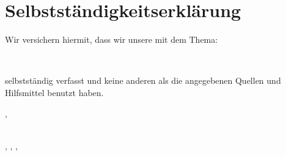 \section*{Selbstständigkeitserklärung}

Wir versichern hiermit, dass wir unsere \dhbwGetTextType{} mit dem Thema:

\begin{center}
    \textbf{%
        {\large \dhbwGetTitle{}}\\
        \ifdef{\dhbwGetSubtitle{}}{%
            \dhbwGetSubtitle{}
        }{}
    }
\end{center}

selbstständig verfasst und keine anderen als die angegebenen Quellen und Hilfsmittel benutzt haben.

\vspace{1cm}
\dhbwGetLocation{},\ \dhbwGetDate{}

\vspace{.5cm}

\dotfill \\
\authorA, \authorB, \authorC, \authorD
